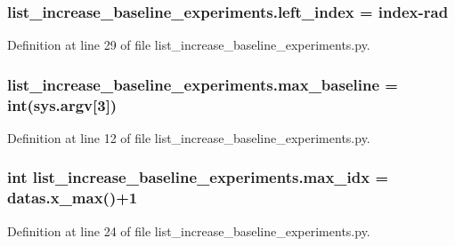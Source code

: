 \subsubsection[{\texorpdfstring{left\+\_\+index}{left_index}}]{\setlength{\rightskip}{0pt plus 5cm}list\+\_\+increase\+\_\+baseline\+\_\+experiments.\+left\+\_\+index = {\bf index}-\/rad}\hypertarget{namespacelist__increase__baseline__experiments_acbd3cf0e7ba4041d01c2360bd9e309be}{}\label{namespacelist__increase__baseline__experiments_acbd3cf0e7ba4041d01c2360bd9e309be}


Definition at line 29 of file list\+\_\+increase\+\_\+baseline\+\_\+experiments.\+py.

\subsubsection[{\texorpdfstring{max\+\_\+baseline}{max_baseline}}]{\setlength{\rightskip}{0pt plus 5cm}list\+\_\+increase\+\_\+baseline\+\_\+experiments.\+max\+\_\+baseline = int(sys.\+argv\mbox{[}3\mbox{]})}\hypertarget{namespacelist__increase__baseline__experiments_aaff4f05a6526a72fb929368019ae7b5f}{}\label{namespacelist__increase__baseline__experiments_aaff4f05a6526a72fb929368019ae7b5f}


Definition at line 12 of file list\+\_\+increase\+\_\+baseline\+\_\+experiments.\+py.

\subsubsection[{\texorpdfstring{max\+\_\+idx}{max_idx}}]{\setlength{\rightskip}{0pt plus 5cm}int list\+\_\+increase\+\_\+baseline\+\_\+experiments.\+max\+\_\+idx = datas.\+x\+\_\+max()+1}\hypertarget{namespacelist__increase__baseline__experiments_a20d2d54a7783f349843582188a006f5a}{}\label{namespacelist__increase__baseline__experiments_a20d2d54a7783f349843582188a006f5a}


Definition at line 24 of file list\+\_\+increase\+\_\+baseline\+\_\+experiments.\+py.

